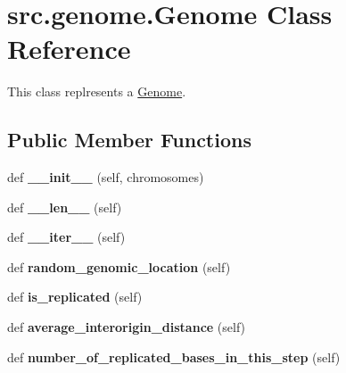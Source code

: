 \hypertarget{classsrc_1_1genome_1_1Genome}{}\section{src.\+genome.\+Genome Class Reference}
\label{classsrc_1_1genome_1_1Genome}


This class replresents a \mbox{\hyperlink{classsrc_1_1genome_1_1Genome}{Genome}}.  


\subsection*{Public Member Functions}
\begin{DoxyCompactItemize}
\item 
\mbox{\label{classsrc_1_1genome_1_1Genome_a0c41beb5b0dc736d2af6f13cae089294}} 
def {\bfseries \+\_\+\+\_\+init\+\_\+\+\_\+} (self, chromosomes)
\item 
\mbox{\label{classsrc_1_1genome_1_1Genome_acda668d8661655244fae81faeeff9238}} 
def {\bfseries \+\_\+\+\_\+len\+\_\+\+\_\+} (self)
\item 
\mbox{\label{classsrc_1_1genome_1_1Genome_ab9872a2ddb51ebd179a5a566569ad92f}} 
def {\bfseries \+\_\+\+\_\+iter\+\_\+\+\_\+} (self)
\item 
\mbox{\label{classsrc_1_1genome_1_1Genome_a4eb85fefb93be22444e181b785fe0705}} 
def {\bfseries random\+\_\+genomic\+\_\+location} (self)
\item 
\mbox{\label{classsrc_1_1genome_1_1Genome_a84746dc3a84c2b10326df7781ae1656e}} 
def {\bfseries is\+\_\+replicated} (self)
\item 
\mbox{\label{classsrc_1_1genome_1_1Genome_a6950c8f65b656f458390399d98c35262}} 
def {\bfseries average\+\_\+interorigin\+\_\+distance} (self)
\item 
\mbox{\label{classsrc_1_1genome_1_1Genome_a72a07c70c14306eb92edc95f1f3cc113}} 
def {\bfseries number\+\_\+of\+\_\+replicated\+\_\+bases\+\_\+in\+\_\+this\+\_\+step} (self)
\end{DoxyCompactItemize}
